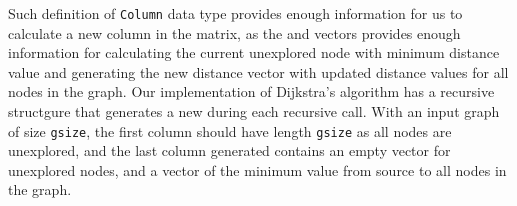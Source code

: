Such definition of \texttt{Column} data type provides enough information for us to calculate a new column in the matrix, as the  and  vectors provides enough information for calculating the current unexplored node with minimum distance value and generating the new distance vector with updated distance values for all nodes in the graph. Our implementation of Dijkstra's algorithm has a recursive structgure that generates a new  during each recursive call. With an input graph of size \texttt{gsize}, the first column should have length \texttt{gsize} as all nodes are unexplored, and the last column generated contains an empty vector for unexplored nodes, and a vector of the minimum value from source to all nodes in the graph. 
